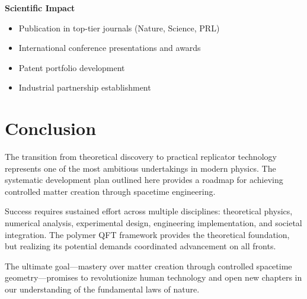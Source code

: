 \documentclass[11pt]{article}
\begin{document}
\textbf{Scientific Impact}
\begin{itemize}
\item Publication in top-tier journals (Nature, Science, PRL)
\item International conference presentations and awards
\item Patent portfolio development
\item Industrial partnership establishment
\end{itemize}

\section{Conclusion}

The transition from theoretical discovery to practical replicator technology represents one of the most ambitious undertakings in modern physics. The systematic development plan outlined here provides a roadmap for achieving controlled matter creation through spacetime engineering.

Success requires sustained effort across multiple disciplines: theoretical physics, numerical analysis, experimental design, engineering implementation, and societal integration. The polymer QFT framework provides the theoretical foundation, but realizing its potential demands coordinated advancement on all fronts.

The ultimate goal—mastery over matter creation through controlled spacetime geometry—promises to revolutionize human technology and open new chapters in our understanding of the fundamental laws of nature.
\end{document}
